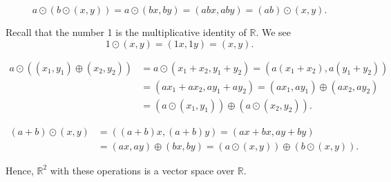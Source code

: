 \begin{solution}
\begin{enumerate}
    \begin{equation*}
        a\odot(b\odot(x,y))=a\odot(bx,by)=(abx,aby)=(ab)\odot(x,y).
    \end{equation*}

    Recall that the number 1 is the multiplicative identity of $ \mathbb{R} $. We see
    \begin{equation*}
        1\odot(x,y)=(1x,1y)=(x,y).
    \end{equation*}

    \begin{align*}
        a\odot((x_1,y_1)\oplus(x_2,y_2)) &= a\odot(x_1\!+x_2,y_1+y_2)=(a(x_1\!+x_2),a(y_1+y_2)) \\
        &= (ax_1\!+ax_2,ay_1+ay_2)=(ax_1,ay_1)\oplus(ax_2,ay_2) \\
        &= (a\odot(x_1,y_1))\oplus(a\odot(x_2,y_2)).
    \end{align*}

    \begin{align*}
        (a+b)\odot(x,y) &= ((a+b)x,(a+b)y)=(ax+bx,ay+by) \\
        &= (ax,ay)\oplus(bx,by)=(a\odot(x,y))\oplus(b\odot(x,y)).
    \end{align*}
\end{enumerate}
Hence, $ \mathbb{R}^2 $ with these operations is a vector space over $ \mathbb{R} $.
\end{solution}

